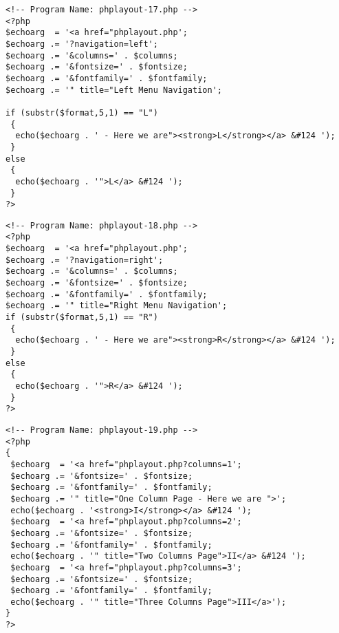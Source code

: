 \documentclass[12pt,a4paper,twosides,ngerman]{scrbook}
\begin{document}
\begin{center}
\begin{minipage}[t]{155mm}
\begin{lstlisting}[captionpos=b, caption=Layout - phplayout-17.php]
<!-- Program Name: phplayout-17.php -->
<?php
$echoarg  = '<a href="phplayout.php';
$echoarg .= '?navigation=left';
$echoarg .= '&columns=' . $columns;
$echoarg .= '&fontsize=' . $fontsize;
$echoarg .= '&fontfamily=' . $fontfamily;
$echoarg .= '" title="Left Menu Navigation';

if (substr($format,5,1) == "L")
 {
  echo($echoarg . ' - Here we are"><strong>L</strong></a> &#124 ');
 }
else
 {
  echo($echoarg . '">L</a> &#124 ');
 }
?>
\end{lstlisting}
\end{minipage}
\end{center} 

\begin{center}
\begin{minipage}[t]{155mm}
\begin{lstlisting}[captionpos=b, caption=Layout - phplayout-18.php]
<!-- Program Name: phplayout-18.php -->
<?php
$echoarg  = '<a href="phplayout.php';
$echoarg .= '?navigation=right';
$echoarg .= '&columns=' . $columns;
$echoarg .= '&fontsize=' . $fontsize;
$echoarg .= '&fontfamily=' . $fontfamily;
$echoarg .= '" title="Right Menu Navigation'; 
if (substr($format,5,1) == "R")
 {
  echo($echoarg . ' - Here we are"><strong>R</strong></a> &#124 ');
 }
else
 {
  echo($echoarg . '">R</a> &#124 ');
 }
?>
\end{lstlisting}
\end{minipage}
\end{center} 

\begin{center}
\begin{minipage}[t]{155mm}
\begin{lstlisting}[captionpos=b, caption=Layout - phplayout-19.php]
<!-- Program Name: phplayout-19.php -->
<?php
{
 $echoarg  = '<a href="phplayout.php?columns=1';
 $echoarg .= '&fontsize=' . $fontsize;
 $echoarg .= '&fontfamily=' . $fontfamily;
 $echoarg .= '" title="One Column Page - Here we are ">';
 echo($echoarg . '<strong>I</strong></a> &#124 ');
 $echoarg  = '<a href="phplayout.php?columns=2';
 $echoarg .= '&fontsize=' . $fontsize;
 $echoarg .= '&fontfamily=' . $fontfamily;
 echo($echoarg . '" title="Two Columns Page">II</a> &#124 ');
 $echoarg  = '<a href="phplayout.php?columns=3';
 $echoarg .= '&fontsize=' . $fontsize;
 $echoarg .= '&fontfamily=' . $fontfamily;
 echo($echoarg . '" title="Three Columns Page">III</a>');
}
?>
\end{lstlisting}
\end{minipage}
\end{center} 
\end{document}
